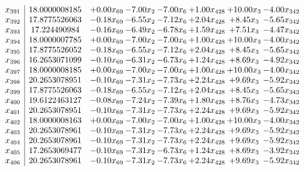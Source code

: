 \documentclass[8pt]{article}
\begin{document}
\[\begin{array}{c| c c@{\hskip 2pt} c@{\hskip 2pt} c@{\hskip 2pt} c@{\hskip 2pt} c@{\hskip 2pt} c@{\hskip 2pt} }
 x_{391}   &  18.0000008185 & +  0.00 x_{69} & -7.00 x_{2} & -7.00 x_{6} & +  1.00 x_{428} & + 10.00 x_{3} & -4.00 x_{342}\\
 x_{392}   &  17.8775526063 & -0.18 x_{69} & -6.55 x_{2} & -7.12 x_{6} & +  2.04 x_{428} & +  8.45 x_{3} & -5.65 x_{342}\\
 x_{393}   &  17.224490984 & -0.16 x_{69} & -6.49 x_{2} & -6.78 x_{6} & +  1.59 x_{428} & +  7.51 x_{3} & -4.47 x_{342}\\
 x_{394}   &  18.0000007785 & +  0.00 x_{69} & -7.00 x_{2} & -7.00 x_{6} & +  1.00 x_{428} & + 10.00 x_{3} & -4.00 x_{342}\\
 x_{395}   &  17.8775526052 & -0.18 x_{69} & -6.55 x_{2} & -7.12 x_{6} & +  2.04 x_{428} & +  8.45 x_{3} & -5.65 x_{342}\\
 x_{396}   &  16.2653071099 & -0.10 x_{69} & -6.31 x_{2} & -6.73 x_{6} & +  1.24 x_{428} & +  8.69 x_{3} & -4.92 x_{342}\\
 x_{397}   &  18.0000008185 & +  0.00 x_{69} & -7.00 x_{2} & -7.00 x_{6} & +  1.00 x_{428} & + 10.00 x_{3} & -4.00 x_{342}\\
 x_{398}   &  20.2653078951 & -0.10 x_{69} & -7.31 x_{2} & -7.73 x_{6} & +  2.24 x_{428} & +  9.69 x_{3} & -5.92 x_{342}\\
 x_{399}   &  17.8775526063 & -0.18 x_{69} & -6.55 x_{2} & -7.12 x_{6} & +  2.04 x_{428} & +  8.45 x_{3} & -5.65 x_{342}\\
 x_{400}   &  19.6122463127 & -0.08 x_{69} & -7.24 x_{2} & -7.39 x_{6} & +  1.80 x_{428} & +  8.76 x_{3} & -4.73 x_{342}\\
 x_{401}   &  20.2653078951 & -0.10 x_{69} & -7.31 x_{2} & -7.73 x_{6} & +  2.24 x_{428} & +  9.69 x_{3} & -5.92 x_{342}\\
 x_{402}   &  18.0000008163 & +  0.00 x_{69} & -7.00 x_{2} & -7.00 x_{6} & +  1.00 x_{428} & + 10.00 x_{3} & -4.00 x_{342}\\
 x_{403}   &  20.2653078961 & -0.10 x_{69} & -7.31 x_{2} & -7.73 x_{6} & +  2.24 x_{428} & +  9.69 x_{3} & -5.92 x_{342}\\
 x_{404}   &  20.2653078961 & -0.10 x_{69} & -7.31 x_{2} & -7.73 x_{6} & +  2.24 x_{428} & +  9.69 x_{3} & -5.92 x_{342}\\
 x_{405}   &  17.2653069477 & -0.10 x_{69} & -7.31 x_{2} & -6.73 x_{6} & +  1.24 x_{428} & +  8.69 x_{3} & -3.92 x_{342}\\
 x_{406}   &  20.2653078961 & -0.10 x_{69} & -7.31 x_{2} & -7.73 x_{6} & +  2.24 x_{428} & +  9.69 x_{3} & -5.92 x_{342}\\

\end{array}\]
\end{document}
